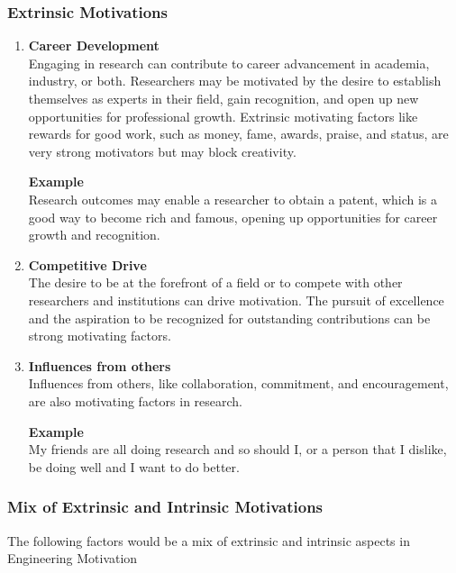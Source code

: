 \documentclass{article}
\begin{document}
	\subsubsection{Extrinsic Motivations}
	\begin{enumerate}[label=\textbf{\roman*)}]
		\item \textbf{Career Development} \\
		Engaging in research can contribute to career advancement in academia, industry, or both.
		Researchers may be motivated by the desire to establish themselves as experts in their field, gain
		recognition, and open up new opportunities for professional growth. Extrinsic motivating factors like
		rewards for good work, such as money, fame, awards, praise, and status, are very strong motivators but
		may block creativity.

		\textbf{Example} \\
		Research outcomes may enable a researcher to obtain a patent, which is a good way to become rich and
		famous, opening up opportunities for career growth and recognition.

		\item \textbf{Competitive Drive} \\
		The desire to be at the forefront of a field or to compete with other researchers and institutions can
		drive motivation.
		The pursuit of excellence and the aspiration to be recognized for outstanding contributions can be
		strong motivating factors.

		\item \textbf{Influences from others} \\
		Influences from others, like collaboration, commitment, and encouragement, are also motivating factors
		in research.

		\textbf{Example} \\
		My friends are all doing research and so should I, or a person that I dislike, be doing well and I want
		to do better.
	\end{enumerate}

	\subsubsection{Mix of Extrinsic and Intrinsic Motivations}
	The following factors would be a mix of extrinsic and intrinsic aspects in Engineering Motivation
\end{document}
